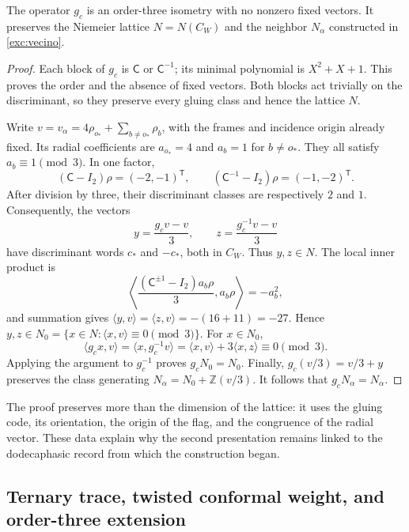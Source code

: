 \begin{proposition}
\label{km:estabilidad-vecino}
The operator \(g_c\) is an order-three isometry with no nonzero fixed
vectors. It preserves the Niemeier lattice \(N=N(C_W)\) and the
neighbor \(N_\alpha\) constructed in \eqref{exc:vecino}.
\end{proposition}
\begin{proof}
Each block of \(g_c\) is \(\mathsf C\) or \(\mathsf C^{-1}\);
its minimal polynomial is \(X^2+X+1\). This proves the order and
the absence of fixed vectors. Both blocks act trivially on the
discriminant, so they preserve every gluing class and hence the
lattice \(N\).

Write \(v=v_\alpha=4\rho_{o_*}+\sum_{b\ne o_*}\rho_b\),
with the frames and incidence origin already fixed. Its radial
coefficients are \(a_{o_*}=4\) and \(a_b=1\) for \(b\ne o_*\).
They all satisfy \(a_b\equiv1\pmod3\). In one factor,
\[
 (\mathsf C-I_2)\rho=(-2,-1)^{\mathsf T},\qquad
 (\mathsf C^{-1}-I_2)\rho=(-1,-2)^{\mathsf T}.
\]
After division by three, their discriminant classes are respectively
\(2\) and \(1\). Consequently, the vectors
\begin{equation}
 y=\frac{g_cv-v}{3},\qquad z=\frac{g_c^{-1}v-v}{3}
 \label{km:desplazamientos}
\end{equation}
have discriminant words \(c_*\) and \(-c_*\), both in \(C_W\).
Thus \(y,z\in N\). The local inner product is
\[
 \left\langle
 \frac{(\mathsf C^{\pm1}-I_2)a_b\rho}{3},a_b\rho
 \right\rangle=-a_b^2,
\]
and summation gives
\(\langle y,v\rangle=\langle z,v\rangle=-(16+11)=-27\).
Hence \(y,z\in N_0=\{x\in N:\langle x,v\rangle\equiv0\pmod3\}\).
For \(x\in N_0\),
\[
 \langle g_cx,v\rangle
 =\langle x,g_c^{-1}v\rangle
 =\langle x,v\rangle+3\langle x,z\rangle\equiv0\pmod3.
\]
Applying the argument to \(g_c^{-1}\) proves \(g_cN_0=N_0\).
Finally, \(g_c(v/3)=v/3+y\) preserves the class generating
\(N_\alpha=N_0+\mathbb Z(v/3)\). It follows that
\(g_cN_\alpha=N_\alpha\).
\end{proof}

The proof preserves more than the dimension of the lattice: it uses
the gluing code, its orientation, the origin of the flag, and the
congruence of the radial vector. These data explain why the second
presentation remains linked to the dodecaphasic record from which
the construction began.

\subsection{Ternary trace, twisted conformal weight, and order-three extension}
\label{km:orbifold-tres}

